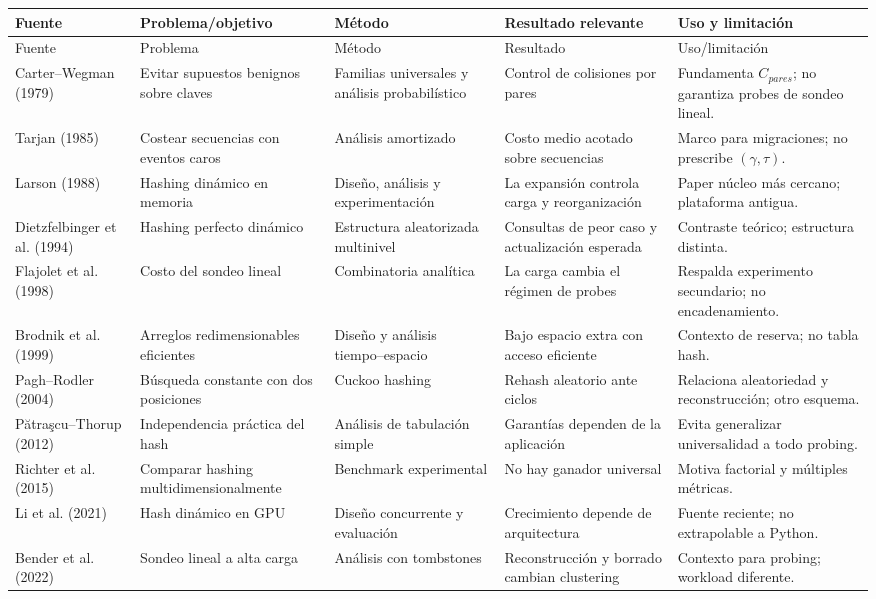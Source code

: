 \small
\begin{longtable}{p{2.5cm}p{3cm}p{3cm}p{3.4cm}p{2.8cm}}
\toprule
Fuente & Problema/objetivo & Método & Resultado relevante & Uso y limitación \\
\midrule\endfirsthead
\toprule Fuente & Problema & Método & Resultado & Uso/limitación \\\midrule\endhead
Carter--Wegman (1979) & Evitar supuestos benignos sobre claves & Familias universales y análisis probabilístico & Control de colisiones por pares & Fundamenta $C_{pares}$; no garantiza probes de sondeo lineal.\\
Tarjan (1985) & Costear secuencias con eventos caros & Análisis amortizado & Costo medio acotado sobre secuencias & Marco para migraciones; no prescribe $(\gamma,\tau)$.\\
Larson (1988) & Hashing dinámico en memoria & Diseño, análisis y experimentación & La expansión controla carga y reorganización & Paper núcleo más cercano; plataforma antigua.\\
Dietzfelbinger et al. (1994) & Hashing perfecto dinámico & Estructura aleatorizada multinivel & Consultas de peor caso y actualización esperada & Contraste teórico; estructura distinta.\\
Flajolet et al. (1998) & Costo del sondeo lineal & Combinatoria analítica & La carga cambia el régimen de probes & Respalda experimento secundario; no encadenamiento.\\
Brodnik et al. (1999) & Arreglos redimensionables eficientes & Diseño y análisis tiempo--espacio & Bajo espacio extra con acceso eficiente & Contexto de reserva; no tabla hash.\\
Pagh--Rodler (2004) & Búsqueda constante con dos posiciones & Cuckoo hashing & Rehash aleatorio ante ciclos & Relaciona aleatoriedad y reconstrucción; otro esquema.\\
Pătraşcu--Thorup (2012) & Independencia práctica del hash & Análisis de tabulación simple & Garantías dependen de la aplicación & Evita generalizar universalidad a todo probing.\\
Richter et al. (2015) & Comparar hashing multidimensionalmente & Benchmark experimental & No hay ganador universal & Motiva factorial y múltiples métricas.\\
Li et al. (2021) & Hash dinámico en GPU & Diseño concurrente y evaluación & Crecimiento depende de arquitectura & Fuente reciente; no extrapolable a Python.\\
Bender et al. (2022) & Sondeo lineal a alta carga & Análisis con tombstones & Reconstrucción y borrado cambian clustering & Contexto para probing; workload diferente.\\

\end{longtable}
